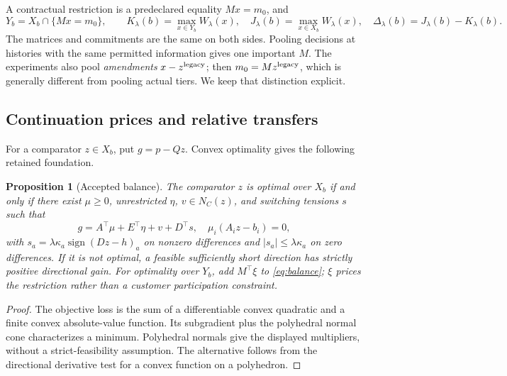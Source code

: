 \documentclass[11pt,letterpaper]{article}
\newtheorem{proposition}[theorem]{Proposition}
\theoremstyle{definition}\newtheorem{assumption}[theorem]{Assumption}
\begin{document}
A contractual restriction is a predeclared equality $Mx=m_0$, and
\begin{equation}\label{eq:values}
 Y_b=X_b\cap\{Mx=m_0\},\qquad
 K_\lambda(b)=\max_{x\in Y_b}W_\lambda(x),\quad
 J_\lambda(b)=\max_{x\in X_b}W_\lambda(x),\quad
 \Delta_\lambda(b)=J_\lambda(b)-K_\lambda(b).
\end{equation}
The matrices and commitments are the same on both sides. Pooling decisions at histories with the same permitted information gives one important $M$. The experiments also pool \emph{amendments} $x-z^{\rm legacy}$; then $m_0=Mz^{\rm legacy}$, which is generally different from pooling actual tiers. We keep that distinction explicit.

\subsection{Continuation prices and relative transfers}
For a comparator $z\in X_b$, put $g=p-Qz$. Convex optimality gives the following retained foundation.
\begin{proposition}[Accepted balance]\label{prop:balance}
The comparator $z$ is optimal over $X_b$ if and only if there exist $\mu\geq0$, unrestricted $\eta$, $v\in N_C(z)$, and switching tensions $s$ such that
\begin{equation}\label{eq:balance}
 g=A^\top\mu+E^\top\eta+v+D^\top s,\quad
 \mu_i(A_i z-b_i)=0,
\end{equation}
with $s_a=\lambda\kappa_a\operatorname{sign}(Dz-h)_a$ on nonzero differences and $|s_a|\leq\lambda\kappa_a$ on zero differences. If it is not optimal, a feasible sufficiently short direction has strictly positive directional gain. For optimality over $Y_b$, add $M^\top\xi$ to \eqref{eq:balance}; $\xi$ prices the restriction rather than a customer participation constraint.
\end{proposition}
\begin{proof}
The objective loss is the sum of a differentiable convex quadratic and a finite convex absolute-value function. Its subgradient plus the polyhedral normal cone characterizes a minimum. Polyhedral normals give the displayed multipliers, without a strict-feasibility assumption. The alternative follows from the directional derivative test for a convex function on a polyhedron.\end{proof}
\end{document}
